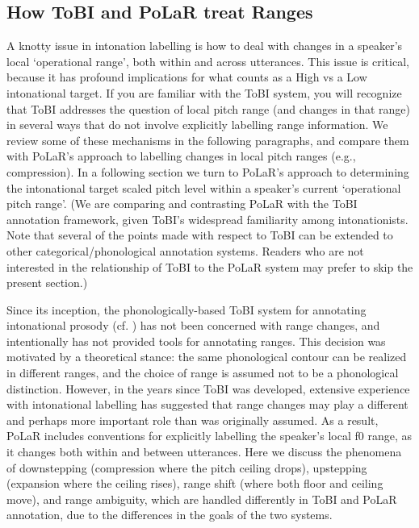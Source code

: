\subsection{How ToBI and PoLaR treat Ranges}\label{sec:how-tobi-and-polar-treat-ranges}
A knotty issue in intonation labelling is how to deal with changes in a speaker’s local ‘operational range’, both within and across utterances.  This issue is critical, because it has profound implications for what counts as a High vs a Low intonational target.  If you are familiar with the ToBI system, you will recognize that ToBI addresses the question of local pitch range (and changes in that range) in several ways that do not involve explicitly labelling range information. We review some of these mechanisms in the following paragraphs, and compare them with PoLaR’s approach to labelling changes in local pitch ranges (e.g., compression).  In a following section we turn to PoLaR’s approach to determining the intonational target scaled pitch level within a speaker’s current ‘operational pitch range’. (We are comparing and contrasting PoLaR with the ToBI annotation framework, given ToBI’s widespread familiarity among intonationists. Note that several of the points made with respect to ToBI can be extended to other categorical\slash phonological annotation systems. Readers who are not interested in the relationship of ToBI to the PoLaR system may prefer to skip the present section.)

Since its inception, the phonologically-based ToBI system for annotating intonational prosody (cf. \citealt{beckman-05}) has not been concerned with range changes, and intentionally has not provided tools for annotating ranges.  This decision was motivated by a theoretical stance: the same phonological contour can be realized in different ranges, and the choice of range is assumed not to be a phonological distinction.  However, in the years since ToBI was developed, extensive experience with intonational labelling has suggested that range changes may play a different and perhaps more important role than was originally assumed.  As a result, PoLaR includes conventions for explicitly labelling the speaker’s local f0 range, as it changes both within and between utterances. Here we discuss the phenomena of downstepping (compression where the pitch ceiling drops), upstepping (expansion where the ceiling rises), range shift (where both floor and ceiling move), and range ambiguity, which are handled differently in ToBI and PoLaR annotation, due to the differences in the goals of the two systems.

